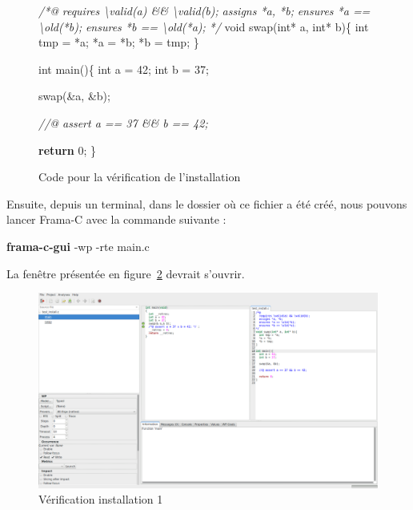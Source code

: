 \documentclass[12pt,francais,]{scrbook}
\newenvironment{Shaded}{}{}
\newcommand{\KeywordTok}[1]{\textcolor[rgb]{0.00,0.44,0.13}{\textbf{{#1}}}}
\newcommand{\DataTypeTok}[1]{\textcolor[rgb]{0.56,0.13,0.00}{{#1}}}
\newcommand{\DecValTok}[1]{\textcolor[rgb]{0.25,0.63,0.44}{{#1}}}
\newcommand{\CommentTok}[1]{\textcolor[rgb]{0.38,0.63,0.69}{\textit{{#1}}}}
\newcommand{\NormalTok}[1]{{#1}}
\begin{document}
\begin{figure}
  \centering
\begin{footnotesize}\begin{Shaded}
\begin{Highlighting}[]
\CommentTok{/*@}
\CommentTok{  requires \textbackslash{}valid(a) && \textbackslash{}valid(b);}
\CommentTok{  assigns *a, *b;}
\CommentTok{  ensures *a == \textbackslash{}old(*b);}
\CommentTok{  ensures *b == \textbackslash{}old(*a);}
\CommentTok{*/}
\DataTypeTok{void} \NormalTok{swap(}\DataTypeTok{int}\NormalTok{* a, }\DataTypeTok{int}\NormalTok{* b)\{}
  \DataTypeTok{int} \NormalTok{tmp = *a;}
  \NormalTok{*a = *b;}
  \NormalTok{*b = tmp;}
\NormalTok{\}}

\DataTypeTok{int} \NormalTok{main()\{}
  \DataTypeTok{int} \NormalTok{a = }\DecValTok{42}\NormalTok{;}
  \DataTypeTok{int} \NormalTok{b = }\DecValTok{37}\NormalTok{;}

  \NormalTok{swap(&a, &b);}

  \CommentTok{//@ assert a == 37 && b == 42;}

  \KeywordTok{return} \DecValTok{0}\NormalTok{;}
\NormalTok{\}}
\end{Highlighting}
\end{Shaded}\end{footnotesize}
\caption{Code pour la vérification de l'installation}
\label{fig:2-2-3-simple}
\end{figure}

Ensuite, depuis un terminal, dans le dossier où ce fichier a été créé,
nous pouvons lancer Frama-C avec la commande suivante :

\begin{footnotesize}\begin{Shaded}
\begin{Highlighting}[]
\KeywordTok{frama-c-gui} \NormalTok{-wp -rte main.c}
\end{Highlighting}
\end{Shaded}\end{footnotesize}

La fenêtre présentée en figure~\ref{fig:install-1} devrait s'ouvrir.

\begin{figure}[htbp]
\centering
\includegraphics[scale=0.5]{1-2-verif_install-1.png}
\caption{Vérification installation 1}
\label{fig:install-1}
\end{figure}
\end{document}

